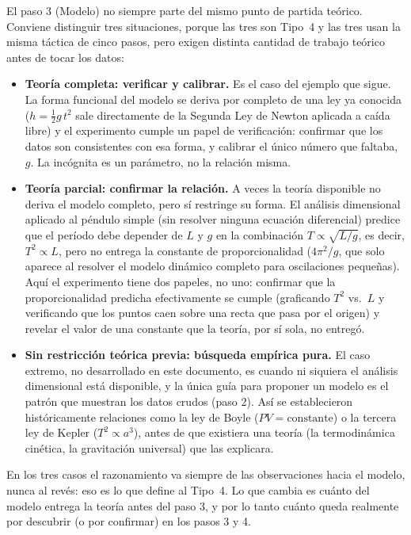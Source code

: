 \documentclass[11pt]{book}
\begin{document}
\medskip
El paso 3 (Modelo) no siempre parte del mismo punto de partida teórico. Conviene distinguir tres situaciones, porque las tres son Tipo~4 y las tres usan la misma táctica de cinco pasos, pero exigen distinta cantidad de trabajo teórico antes de tocar los datos:

\begin{itemize}
    \item {\bf Teoría completa: verificar y calibrar.} Es el caso del ejemplo que sigue. La forma funcional del modelo se deriva por completo de una ley ya conocida ($h = \tfrac{1}{2}g\,t^2$ sale directamente de la Segunda Ley de Newton aplicada a caída libre) y el experimento cumple un papel de verificación: confirmar que los datos son consistentes con esa forma, y calibrar el único número que faltaba, $g$. La incógnita es un parámetro, no la relación misma.

    \item {\bf Teoría parcial: confirmar la relación.} A veces la teoría disponible no deriva el modelo completo, pero sí restringe su forma. El análisis dimensional aplicado al péndulo simple (sin resolver ninguna ecuación diferencial) predice que el período debe depender de $L$ y $g$ en la combinación $T \propto \sqrt{L/g}$, es decir, $T^2 \propto L$, pero no entrega la constante de proporcionalidad ($4\pi^2/g$, que solo aparece al resolver el modelo dinámico completo para oscilaciones pequeñas). Aquí el experimento tiene dos papeles, no uno: confirmar que la proporcionalidad predicha efectivamente se cumple (graficando $T^2$ vs.\ $L$ y verificando que los puntos caen sobre una recta que pasa por el origen) y revelar el valor de una constante que la teoría, por sí sola, no entregó.

    \item {\bf Sin restricción teórica previa: búsqueda empírica pura.} El caso extremo, no desarrollado en este documento, es cuando ni siquiera el análisis dimensional está disponible, y la única guía para proponer un modelo es el patrón que muestran los datos crudos (paso 2). Así se establecieron históricamente relaciones como la ley de Boyle ($PV=\text{constante}$) o la tercera ley de Kepler ($T^2\propto a^3$), antes de que existiera una teoría (la termodinámica cinética, la gravitación universal) que las explicara.
\end{itemize}

En los tres casos el razonamiento va siempre de las observaciones hacia el modelo, nunca al revés: eso es lo que define al Tipo~4. Lo que cambia es cuánto del modelo entrega la teoría antes del paso 3, y por lo tanto cuánto queda realmente por descubrir (o por confirmar) en los pasos 3 y 4.
\end{document}
